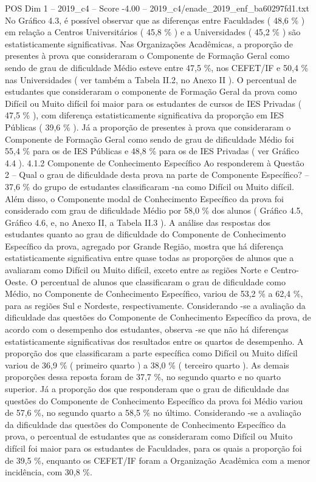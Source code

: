 \begin{textsample}{POS Dim 1 – 2019\_c4 – Score -4.00 – 2019\_c4/enade\_2019\_enf\_ba60297fd1.txt}
No Gráfico 4.3, é possível observar que as diferenças entre Faculdades ( 48,6 \% ) em relação a Centros Universitários ( 45,8 \% ) e a Universidades ( 45,2 \% ) são estatisticamente significativas.
Nas Organizações Acadêmicas, a proporção de presentes à prova que consideraram o Componente de Formação Geral como sendo de grau de dificuldade Médio esteve entre 47,5 \%, nos CEFET/IF e 50,4 \% nas Universidades ( ver também a Tabela II.2, no Anexo II ).
O percentual de estudantes que consideraram o componente de Formação Geral da prova como Difícil ou Muito difícil foi maior para os estudantes de cursos de IES Privadas ( 47,5 \% ), com diferença estatisticamente significativa da proporção em IES Públicas ( 39,6 \% ).
Já a proporção de presentes à prova que consideraram o Componente de Formação Geral como sendo de grau de dificuldade Médio foi 55,4 \% para os de IES Públicas e 48,8 \% para os de IES Privadas ( ver Gráfico 4.4 ). 4.1.2 Componente de Conhecimento Específico Ao responderem à Questão 2 – Qual o grau de dificuldade desta prova na parte de Componente Específico? – 37,6 \% do grupo de estudantes classificaram -na como Difícil ou Muito difícil.
Além disso, o Componente modal de Conhecimento Específico da prova foi considerado com grau de dificuldade Médio por 58,0 \% dos alunos ( Gráfico 4.5, Gráfico 4.6, e, no Anexo II, a Tabela II.3 ).
A análise das respostas dos estudantes quanto ao grau de dificuldade do Componente de Conhecimento Específico da prova, agregado por Grande Região, mostra que há diferença estatisticamente significativa entre quase todas as proporções de alunos que a avaliaram como Difícil ou Muito difícil, exceto entre as regiões Norte e Centro-Oeste.
O percentual de alunos que classificaram o grau de dificuldade como Médio, no Componente de Conhecimento Específico, variou de 53,2 \% a 62,4 \%, para as regiões Sul e Nordeste, respectivamente.
Considerando -se a avaliação da dificuldade das questões do Componente de Conhecimento Específico da prova, de acordo com o desempenho dos estudantes, observa -se que não há diferenças estatisticamente significativas dos resultados entre os quartos de desempenho.
A proporção dos que classificaram a parte específica como Difícil ou Muito difícil variou de 36,9 \% ( primeiro quarto ) a 38,0 \% ( terceiro quarto ).
As demais proporções dessa reposta foram de 37,7 \%, no segundo quarto e no quarto superior.
Já a proporção dos que responderam que o grau de dificuldade das questões do Componente de Conhecimento Específico da prova foi Médio variou de 57,6 \%, no segundo quarto a 58,5 \% no último.
Considerando -se a avaliação da dificuldade das questões do Componente de Conhecimento Específico da prova, o percentual de estudantes que as consideraram como Difícil ou Muito difícil foi maior para os estudantes de Faculdades, para os quais a proporção foi de 39,5 \%, enquanto os CEFET/IF foram a Organização Acadêmica com a menor incidência, com 30,8 \%.

\end{textsample}
